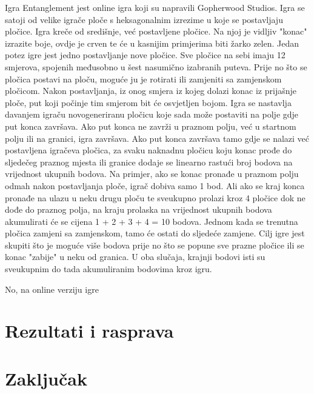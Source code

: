 \documentclass[zavrsnirad]{fer}
\begin{document}
Igra Entanglement jest online igra koji su napravili \cite{gopherwoodstudios} Gopherwood Studios. Igra se satoji od velike igrače ploče s heksagonalnim izrezime u koje se postavljaju pločice. Igra kreče od središnje, već postavljene pločice. Na njoj je vidljiv "konac" izrazite boje, ovdje je crven te će u kasnijim primjerima biti žarko zelen.
Jedan potez igre jest jedno postavljanje nove pločice. Sve pločice na sebi imaju 12 smjerova, spojenih međusobno u šest nasumično izabranih puteva. Prije no što se pločica postavi na ploču, moguće ju je rotirati ili zamjeniti sa zamjenskom pločicom. Nakon postavljanja, iz onog smjera iz kojeg dolazi konac iz prijašnje ploče, put koji počinje tim smjerom bit će osvjetljen bojom. Igra se nastavlja davanjem igraču novogeneriranu pločicu koje sada može postaviti na polje gdje put konca završava.
Ako put konca ne zavrži u praznom polju, već u startnom polju ili na granici, igra završava. Ako put konca završava tamo gdje se nalazi već postavljena igračeva pločica, za svaku naknadnu pločicu koju konac prođe do sljedečeg praznog mjesta ili granice dodaje se linearno rastući broj bodova na vrijednost ukupnih bodova. Na primjer, ako se konac pronađe u praznom polju odmah nakon postavljanja ploče, igrač dobiva samo 1 bod. Ali ako se kraj konca pronađe na ulazu u neku drugu ploču te sveukupno prolazi kroz 4 pločice dok ne dođe do praznog polja, na kraju prolaska na vrijednost ukupnih bodova akumulirati će se cijena 1 + 2 + 3 + 4 = 10 bodova.
Jednom kada se trenutna pločica zamjeni sa zamjenskom, tamo će ostati do sljedeće zamjene. Cilj igre jest skupiti što je moguće više bodova prije no što se popune sve prazne pločice ili se konac "zabije" u neku od granica. U oba slučaja, krajnji bodovi isti su sveukupnim do tada akumuliranim bodovima kroz igru.

No, na online verziju igre


\chapter{Rezultati i rasprava}
\label{pog:rezultati_i_rasprava}

\Blindtext


\chapter{Zaključak}
\label{pog:zakljucak}
\end{document}
